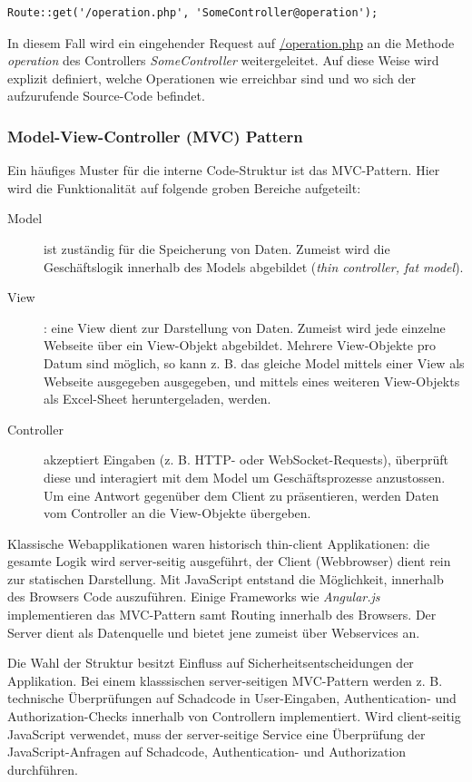 \begin{verbatim}
Route::get('/operation.php', 'SomeController@operation');
\end{verbatim}

In diesem Fall wird ein eingehender Request auf \url{/operation.php} an die Methode \textit{operation} des Controllers \textit{SomeController} weitergeleitet. Auf diese Weise wird explizit definiert, welche Operationen wie erreichbar sind und wo sich der aufzurufende Source-Code befindet.

\subsubsection{Model-View-Controller (MVC) Pattern}

Ein häufiges Muster für die interne Code-Struktur ist das MVC-Pattern. Hier wird die Funktionalität auf folgende groben Bereiche aufgeteilt:

\begin{description}
	\item[Model] ist zuständig für die Speicherung von Daten. Zumeist wird die Geschäftslogik innerhalb des Models abgebildet (\textit{thin controller, fat model}).
	\item[View]: eine View dient zur Darstellung von Daten. Zumeist wird jede einzelne Webseite über ein View-Objekt abgebildet. Mehrere View-Objekte pro Datum sind möglich, so kann z. B. das gleiche Model mittels einer View als Webseite ausgegeben ausgegeben, und mittels eines weiteren View-Objekts als Excel-Sheet heruntergeladen, werden.
	\item[Controller] akzeptiert Eingaben (z. B. HTTP- oder WebSocket-Requests), überprüft diese und interagiert mit dem Model um Geschäftsprozesse anzustossen. Um eine Antwort gegenüber dem Client zu präsentieren, werden Daten vom Controller an die View-Objekte übergeben.
\end{description}

Klassische Webapplikationen waren historisch thin-client Applikationen: die gesamte Logik wird server-seitig ausgeführt, der Client (Webbrowser) dient rein zur statischen Darstellung. Mit JavaScript entstand die Möglichkeit, innerhalb des Browsers Code auszuführen. Einige Frameworks wie \textit{Angular.js} implementieren das MVC-Pattern samt Routing innerhalb des Browsers. Der Server dient als Datenquelle und bietet jene zumeist über Webservices an.

Die Wahl der Struktur besitzt Einfluss auf Sicherheitsentscheidungen der Applikation. Bei einem klasssischen server-seitigen MVC-Pattern werden z. B. technische Überprüfungen auf Schadcode in User-Eingaben, Authentication- und Authorization-Checks innerhalb von Controllern implementiert. Wird client-seitig JavaScript verwendet, muss der server-seitige Service eine Überprüfung der JavaScript-Anfragen auf Schadcode, Authentication- und Authorization durchführen.


